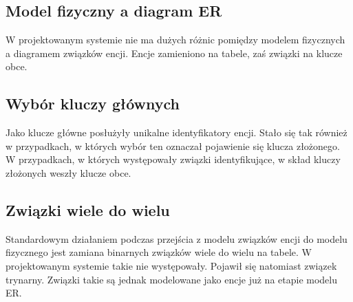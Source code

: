\subsection[Model fizyczny a diagram ER][Model fizyczny a diagram ER]{Model fizyczny a diagram ER}
W projektowanym systemie nie ma dużych różnic pomiędzy modelem fizycznych a diagramem związków encji.
Encje zamieniono na tabele, zaś związki na klucze obce. 

\subsection[Wybór kluczy głównych][Wybór kluczy głównych]{Wybór kluczy głównych}
Jako klucze główne posłużyły unikalne identyfikatory encji. Stało się tak również w przypadkach, w których wybór ten oznaczał pojawienie się klucza złożonego. W przypadkach, w których występowały związki identyfikujące, w skład kluczy złożonych weszły klucze obce.

\subsection[Związki wiele do wielu][Związki wiele do wielu]{Związki wiele do wielu}
Standardowym działaniem podczas przejścia z modelu związków encji do modelu fizycznego jest zamiana binarnych związków wiele do wielu na tabele. W projektowanym systemie takie nie występowały. Pojawił się natomiast związek trynarny. Związki takie są jednak modelowane jako encje już na etapie modelu ER.

